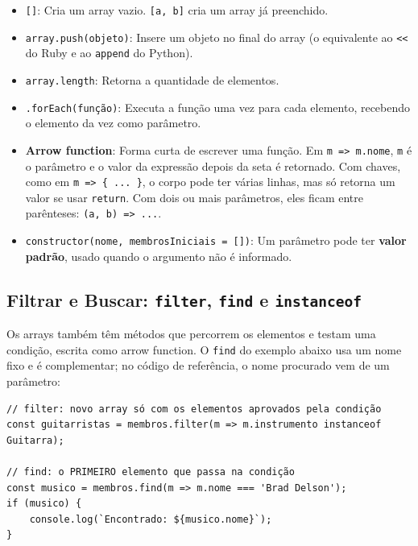 \begin{itemize}
    \item \texttt{[]}: Cria um array vazio. \texttt{[a, b]} cria um array já preenchido.

    \item \texttt{array.push(objeto)}: Insere um objeto no final do array (o equivalente ao
    \texttt{<{}<} do Ruby e ao \texttt{append} do Python).

    \item \texttt{array.length}: Retorna a quantidade de elementos.

    \item \texttt{.forEach(função)}: Executa a função uma vez para cada elemento, recebendo o
    elemento da vez como parâmetro.

    \item \textbf{Arrow function}: Forma curta de escrever uma função. Em
    \texttt{m => m.nome}, \texttt{m} é o parâmetro e o valor da expressão depois da seta é
    retornado. Com chaves, como em \texttt{m => \{ ... \}}, o corpo pode ter várias linhas, mas
    só retorna um valor se usar \texttt{return}. Com dois ou mais parâmetros, eles ficam entre
    parênteses: \texttt{(a, b) => ...}.

    \item \texttt{constructor(nome, membrosIniciais = [])}: Um parâmetro pode ter \textbf{valor
    padrão}, usado quando o argumento não é informado.
\end{itemize}

\subsection{Filtrar e Buscar: \texttt{filter}, \texttt{find} e \texttt{instanceof}}

Os arrays também têm métodos que percorrem os elementos e testam uma condição, escrita como
arrow function. O \texttt{find} do exemplo abaixo usa um nome fixo e é complementar; no código
de referência, o nome procurado vem de um parâmetro:

\begin{lstlisting}[style=javascript]
// filter: novo array só com os elementos aprovados pela condição
const guitarristas = membros.filter(m => m.instrumento instanceof Guitarra);

// find: o PRIMEIRO elemento que passa na condição
const musico = membros.find(m => m.nome === 'Brad Delson');
if (musico) {
    console.log(`Encontrado: ${musico.nome}`);
}
\end{lstlisting}

